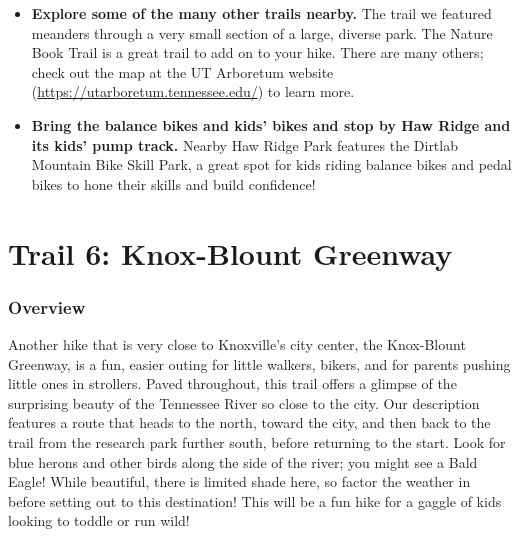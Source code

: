 \documentclass[
  letterpaper,
  DIV=11,
  numbers=noendperiod]{scrreprt}
\providecommand{\tightlist}{%
  \setlength{\itemsep}{0pt}\setlength{\parskip}{0pt}}\usepackage{longtable,booktabs,array}
\begin{document}
\begin{itemize}
\tightlist
\item
  \textbf{Explore some of the many other trails nearby.} The trail we
  featured meanders through a very small section of a large, diverse
  park. The Nature Book Trail is a great trail to add on to your hike.
  There are many others; check out the map at the UT Arboretum website
  (\url{https://utarboretum.tennessee.edu/}) to learn more.
\item
  \textbf{Bring the balance bikes and kids' bikes and stop by Haw Ridge
  and its kids' pump track.} Nearby Haw Ridge Park features the Dirtlab
  Mountain Bike Skill Park, a great spot for kids riding balance bikes
  and pedal bikes to hone their skills and build confidence!
\end{itemize}

\chapter{Trail 6: Knox-Blount
Greenway}\label{trail-6-knox-blount-greenway}

\subsection{Overview}\label{overview-6}

Another hike that is very close to Knoxville's city center, the
Knox-Blount Greenway, is a fun, easier outing for little walkers,
bikers, and for parents pushing little ones in strollers. Paved
throughout, this trail offers a glimpse of the surprising beauty of the
Tennessee River so close to the city. Our description features a route
that heads to the north, toward the city, and then back to the trail
from the research park further south, before returning to the start.
Look for blue herons and other birds along the side of the river; you
might see a Bald Eagle! While beautiful, there is limited shade here, so
factor the weather in before setting out to this destination! This will
be a fun hike for a gaggle of kids looking to toddle or run wild!
\end{document}
